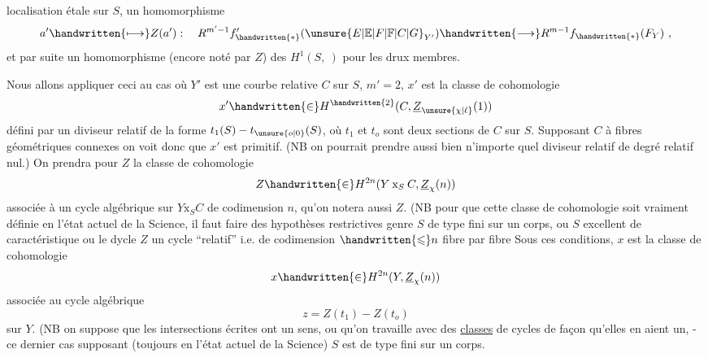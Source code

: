 localisation étale sur $S$, un homomorphisme
\[
a'\handwritten{\longmapsto}Z(a'):\quad R^{m'-1}f'_{\handwritten{*}}({\unsure{E|\mathbb{E}|F|\mathbb{F}|C|G}}_{Y'})\handwritten{\longrightarrow}R^{m-1}f_{\handwritten{*}}(F_Y)\ ,
\]
et par suite un homomorphisme (encore noté par $Z$) des $H^1(S,\ )$ pour les drux membres.

Nous allons appliquer ceci au cas où $Y'$ est une courbe relative $C$ sur $S$, $m'=2$, $x'$ est la classe de cohomologie
\[
x'\handwritten{\in}H^{\handwritten{2}}(C,\underline{Z}_{\unsure{\chi|\ell}}(1))
\]
défini par un diviseur relatif de la forme $t_1(S)-t_{\unsure{o|0}}(S)$, où $t_1$ et $t_o$ sont deux sections de $C$ sur $S$. Supposant $C$ à fibres géométriques connexes on voit donc que $x'$ est primitif. (NB on pourrait prendre aussi bien n'importe quel diviseur relatif de degré relatif nul.) On prendra pour $Z$ la classe de cohomologie
\[
Z\handwritten{\in}H^{2n}(Y\mathbin{\mathrm{x}}_S C,\underline{Z}_{\chi}(n))
\]
associée à un cycle algébrique sur $Y\mathbin{\mathrm{x}}_S C$ de codimension $n$, qu'on notera aussi $Z$. (NB pour que cette classe de cohomologie soit vraiment définie en l'état actuel de la Science, il faut faire des hypothèses restrictives genre $S$ de type fini sur un corps, ou $S$ excellent de caractéristique  ou le dycle $Z$ un cycle ``relatif'' i.e. de codimension $\handwritten{\leqslant}n$ fibre par fibre
Sous ces conditions, $x$ est la classe de cohomologie
\[
x\handwritten{\in}H^{2n}(Y,\underline{Z}_{\chi}(n))
\]
associée au cycle algébrique
\[
z=Z(t_1)-Z(t_o)
\]
sur $Y$. (NB on suppose que les intersections écrites ont un sens, ou qu'on travaille avec des \uline{classes} de cycles de façon qu'elles en aient un, - ce dernier cas supposant (toujours en l'état actuel de la Science)  $S$ est de type fini sur un corps.
